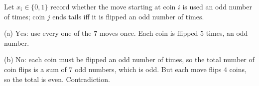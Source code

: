Let $x_i\in\{0,1\}$ record whether the move starting at coin $i$ is used an odd number of times; coin $j$ ends tails iff it is flipped an odd number of times.

(a) $\boxed{\text{Yes}}$: use every one of the $7$ moves once. Each coin is flipped $5$ times, an odd number.

(b) $\boxed{\text{No}}$: each coin must be flipped an odd number of times, so the total number of coin flips is a sum of $7$ odd numbers, which is odd. But each move flips $4$ coins, so the total is even. Contradiction.
